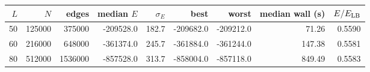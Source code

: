 \begin{tabular}{rrrrrrrrr}
\toprule
$L$ & $N$ & edges & median $E$ & $\sigma_E$ & best & worst & median wall (s) & $E/E_{\rm LB}$ \\
\midrule
50 & 125000 & 375000 & -209528.0 & 182.7 & -209682.0 & -209212.0 & 71.26 & 0.5590 \\
60 & 216000 & 648000 & -361374.0 & 245.7 & -361884.0 & -361244.0 & 147.38 & 0.5581 \\
80 & 512000 & 1536000 & -857528.0 & 313.7 & -858004.0 & -857118.0 & 849.49 & 0.5583 \\
\bottomrule
\end{tabular}
